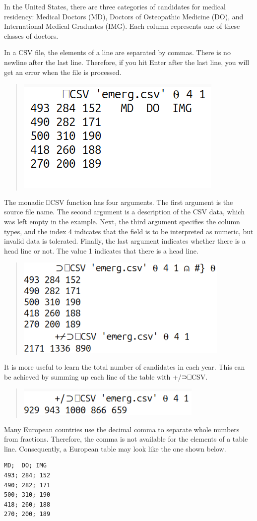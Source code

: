 \documentclass[a4paper,12pt]{book}
\begin{document}
In the United States, there are
three categories of candidates
for medical residency: Medical
Doctors (MD), Doctors of Osteopathic
Medicine (DO), and International
Medical Graduates (IMG). Each
column represents one of these
classes of doctors.

In a CSV file, the elements of
a line are separated by commas.
There is no newline after the
last line. Therefore, if you hit
Enter after the last line, you
will get an error when the file
is processed.
\begin{quote}
\includegraphics{srcfigs/CSVemerg.png}
\end{quote}
The monadic ⎕CSV function has four
arguments. The first argument is
the source file name. The second
argument is a description of the
CSV data, which was left empty in
the example. Next, the third
argument specifies the column
types, and the index 4 indicates
that the field is to be interpreted
as numeric, but invalid data is
tolerated. Finally, the last
argument indicates whether there
is a head line or not. The
value 1 indicates that there
is a head line.
\begin{quote}
\includegraphics{srcfigs/CSV-remove-header.png}
\end{quote}
It is more useful to learn the total
number of candidates in each year.
This can be achieved by summing up
each line of the table with +/⊃⎕CSV.
\begin{quote}
\includegraphics{srcfigs/CSV-sum-lines.png}
\end{quote}
Many European countries use the decimal
comma to separate whole numbers from fractions.
Therefore, the comma is not available for
the elements of a table line. Consequently,
a European table may look like the one shown below.
\begin{verbatim}
MD;  DO; IMG
493; 284; 152
490; 282; 171
500; 310; 190
418; 260; 188
270; 200; 189
\end{verbatim}
\end{document}
